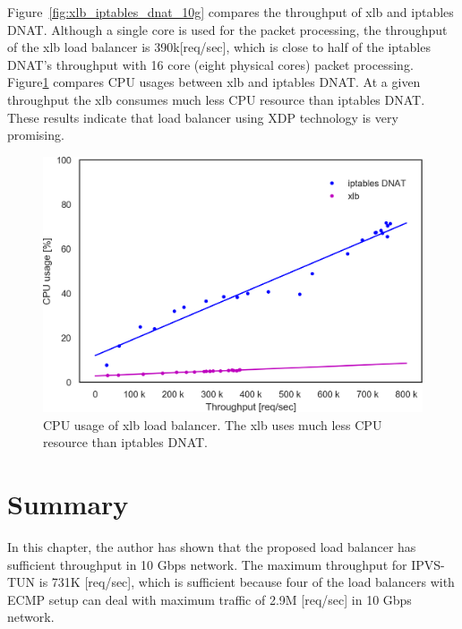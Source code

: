 Figure~\ref{fig:xlb_iptables_dnat_10g} compares the throughput of xlb and iptables DNAT. 
Although a single core is used for the packet processing, the throughput of the xlb load balancer is 390k[req/sec], which is close to half of the iptables DNAT's throughput with 16 core (eight physical cores) packet processing.
Figure\ref{fig:cpu_usage_10g_xlb} compares CPU usages between xlb and iptables DNAT.
At a given throughput the xlb consumes much less CPU resource than iptables DNAT.
These results indicate that load balancer using XDP technology is very promising.


\begin{figure}[h]
  \centering
  \includegraphics[width=0.9\columnwidth]{Figs/cpu_usage_10g_xlb}
  \par\bigskip
  \centering
  \begin{minipage}{0.9\columnwidth}
    \caption[CPU usage of xlb load balancer]{
      CPU usage of xlb load balancer.
      The xlb uses much less CPU resource than iptables DNAT.
    }
    \label{fig:cpu_usage_10g_xlb}
  \end{minipage}
\end{figure}

\FloatBarrier

\section{Summary}


In this chapter, the author has shown that the proposed load balancer has sufficient throughput in 10 Gbps network.
The maximum throughput for IPVS-TUN is 731K [req/sec], which is sufficient because four of the load balancers with ECMP setup can deal with maximum traffic of 2.9M [req/sec] in 10 Gbps network.



